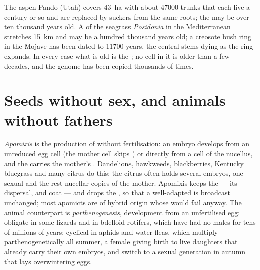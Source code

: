 \begin{example}\label{ex:b2:asexual-reproduction:oldest}
The aspen  Pando (Utah) covers \qty{43}{ha} with about
\num{47000} trunks that each live a century or so and are replaced
by suckers from the same roots; the  may be over ten thousand
years old. A  of the seagrass \emph{Posidonia} in the
Mediterranean stretches \qty{15}{km} and may be a hundred thousand
years old; a creosote bush ring in the Mojave has been dated to
\num{11700} years, the central stems dying as the ring expands. In
every case what is old is the ; no cell in it is older than a
few decades, and the genome has been copied thousands of times.
\end{example}

\section{Seeds without sex, and animals without fathers}

\begin{definition}[Apomixis]\label{def:b2:asexual-reproduction:apomixis}
\emph{Apomixis} is the production of  without fertilisation: an
embryo develops from an unreduced egg cell (the  mother cell
skips ) or directly from a cell of the nucellus, and the 
carries the mother's . Dandelions, hawkweeds, blackberries,
Kentucky bluegrass and many citrus do this; the citrus  often
holds several embryos, one sexual and the rest nucellar copies of the
mother. Apomixis keeps the  --- its dispersal,  and coat
--- and drops the , so that a well-adapted  is
broadcast unchanged; most apomicts are  of hybrid origin
whose  would fail anyway. The animal counterpart is
\emph{parthenogenesis}, development from an unfertilised egg:
obligate in some lizards and in bdelloid rotifers, which have had no
males for tens of millions of years; cyclical in aphids and water
fleas, which multiply parthenogenetically all summer, a female giving
birth to live daughters that already carry their own embryos, and
switch to a sexual generation in autumn that lays overwintering
eggs.
\end{definition}

